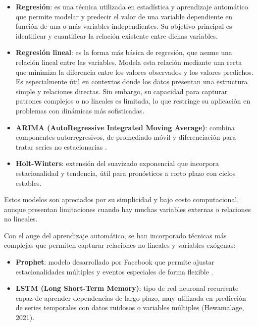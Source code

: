 \begin{itemize}

    \item \textbf{Regresión}: es una técnica utilizada en estadística y aprendizaje automático que permite modelar y predecir el valor de una variable dependiente en función de una o más variables independientes. Su objetivo principal es identificar y cuantificar la relación existente entre dichas variables.

    \item \textbf{Regresión lineal}: es la forma más básica de regresión, que asume una relación lineal entre las variables. Modela esta relación mediante una recta que minimiza la diferencia entre los valores observados y los valores predichos. Es especialmente útil en contextos donde los datos presentan una estructura simple y relaciones directas. Sin embargo, su capacidad para capturar patrones complejos o no lineales es limitada, lo que restringe su aplicación en problemas con dinámicas más sofisticadas.
    
    \item \textbf{ARIMA (AutoRegressive Integrated Moving Average)}: combina componentes autorregresivos, de promediado móvil y diferenciación para tratar series no estacionarias \parencite{box2015}.
    
    \item \textbf{Holt-Winters}: extensión del suavizado exponencial que incorpora estacionalidad y tendencia, útil para pronósticos a corto plazo con ciclos estables.
\end{itemize}

Estos modelos son apreciados por su simplicidad y bajo costo computacional, aunque presentan limitaciones cuando hay muchas variables externas o relaciones no lineales.

Con el auge del aprendizaje automático, se han incorporado técnicas más complejas que permiten capturar relaciones no lineales y variables exógenas:

\begin{itemize}
    \item \textbf{Prophet}: modelo desarrollado por Facebook que permite ajustar estacionalidades múltiples y eventos especiales de forma flexible \parencite{taylor2018}.
    
    \item \textbf{LSTM (Long Short-Term Memory)}: tipo de red neuronal recurrente capaz de aprender dependencias de largo plazo, muy utilizada en predicción de series temporales con datos ruidosos o variables múltiples (Hewamalage, 2021).
\end{itemize}

